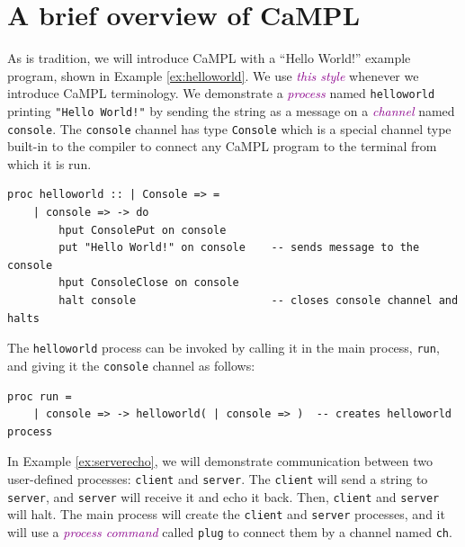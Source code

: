\documentclass[acmsmall]{acmart}
\newcommand{\tc}[1]{\textcolor{darkMagenta}{\textit{#1}}}
\begin{document}




\section{A brief overview of CaMPL}
\label{Sec:brief_overview}

As is tradition, we will introduce CaMPL with a ``Hello World!'' example program, shown in Example \ref{ex:helloworld}.
We use \tc{this style} whenever we introduce CaMPL terminology.
We demonstrate a \tc{process} named \lstinline$helloworld$ printing \lstinline$"Hello World!"$ by sending the string as a message on a \tc{channel} named \lstinline$console$.
The \lstinline$console$ channel has type \lstinline$Console$ which is a special channel type built-in to the compiler to connect any CaMPL program to the terminal from which it is run.
\begin{lstlisting}[label=ex:helloworld, caption=Hello World!, name=helloworld] 
proc helloworld :: | Console => = 
	| console => -> do
		hput ConsolePut on console
		put "Hello World!" on console    -- sends message to the console        
		hput ConsoleClose on console
		halt console                     -- closes console channel and halts               
\end{lstlisting}
The \lstinline$helloworld$ process can be invoked by calling it in the main process, \lstinline$run$, and giving it the \lstinline$console$ channel as follows:
\begin{lstlisting}[name=helloworld]
proc run = 
	| console => -> helloworld( | console => )  -- creates helloworld process
\end{lstlisting}


In Example \ref{ex:serverecho}, we will demonstrate communication between two user-defined processes: \lstinline$client$ and \lstinline$server$. 
The \lstinline$client$ will send a string to \lstinline$server$, and \lstinline$server$ will receive it and echo it back.
Then, \lstinline$client$ and \lstinline$server$ will halt.
The main process will create the \lstinline$client$ and \lstinline$server$ processes, and it will use a \tc{process command} called \lstinline$plug$ to connect them by a channel named \lstinline$ch$.
\end{document}
